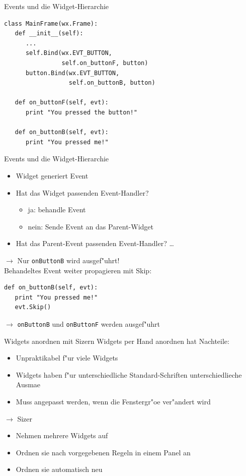 \begin{frame}[fragile]{Events und die Widget-Hierarchie}
\begin{lstlisting}[style=Python]
class MainFrame(wx.Frame):
   def __init__(self):
      ...
      self.Bind(wx.EVT_BUTTON,
                self.on_buttonF, button)
      button.Bind(wx.EVT_BUTTON,
                  self.on_buttonB, button)

   def on_buttonF(self, evt):
      print "You pressed the button!"

   def on_buttonB(self, evt):
      print "You pressed me!"
\end{lstlisting}
\end{frame}

\begin{frame}[fragile]{Events und die Widget-Hierarchie}
\begin{itemize}
\item Widget generiert Event
\item Hat das Widget passenden Event-Handler?
  \begin{itemize} 
    \item{ja}: behandle Event
    \item{nein}: Sende Event an das Parent-Widget
  \end{itemize}
\item Hat das Parent-Event passenden Event-Handler? \dots
\end{itemize}
$\rightarrow$ Nur \lstinline{onButtonB} wird ausgef"uhrt!\\[3mm]

Behandeltes Event weiter propagieren mit \alert{Skip}:
\begin{lstlisting}[style=Python]
def on_buttonB(self, evt):
   print "You pressed me!"
   evt.Skip()
\end{lstlisting}
$\rightarrow$ \lstinline{onButtonB} und \lstinline{onButtonF} werden ausgef"uhrt
\end{frame}

\begin{frame}{Widgets anordnen mit Sizern}
Widgets per Hand anordnen hat Nachteile:
\begin{itemize}
\item Unpraktikabel f"ur viele Widgets
\item Widgets haben f"ur unterschiedliche Standard-Schriften unterschiedlieche Ausma\3e
\item Muss angepasst werden, wenn die Fenstergr"o\3e ver"andert wird
\end{itemize}
$\rightarrow$ \alert{Sizer}
\begin{itemize}
\item Nehmen mehrere Widgets auf
\item Ordnen sie nach vorgegebenen Regeln in einem Panel an
\item Ordnen sie automatisch neu
\end{itemize}
\end{frame}

